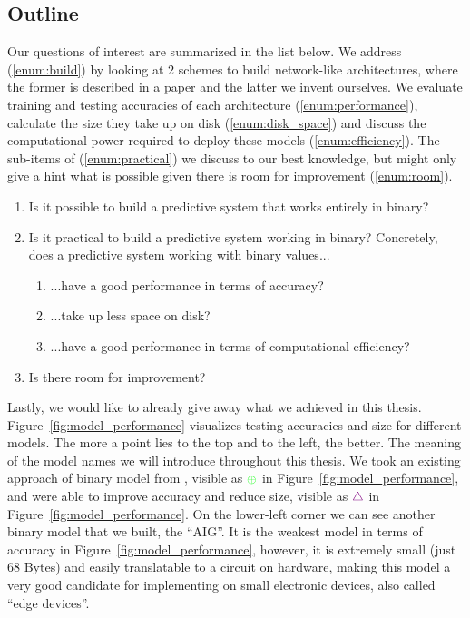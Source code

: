 \subsection{Outline}
Our questions of interest are summarized in the list below. We address (\ref{enum:build}) by looking at 2 schemes to build network-like architectures, where the former is described in a paper \cite{bib:chatterjee2018learning} and the latter we invent ourselves. We evaluate training and testing accuracies of each architecture (\ref{enum:performance}), calculate the size they take up on disk (\ref{enum:disk_space}) and discuss the computational power required to deploy these models (\ref{enum:efficiency}). The sub-items of (\ref{enum:practical}) we discuss to our best knowledge, but might only give a hint what is possible given there is room for improvement (\ref{enum:room}).

\begin{enumerate}
  \item \label{enum:build} Is it possible to build a predictive system that works entirely in binary?
  \item \label{enum:practical} Is it practical to build a predictive system working in binary? Concretely, does a predictive system working with binary values...
    \begin{enumerate}
      \item \label{enum:performance} ...have a good performance in terms of accuracy?
      \item \label{enum:disk_space} ...take up less space on disk?
      \item \label{enum:efficiency} ...have a good performance in terms of computational efficiency?
    \end{enumerate}
  \item \label{enum:room} Is there room for improvement?
\end{enumerate}

\noindent Lastly, we would like to already give away what we achieved in this thesis. Figure~\ref{fig:model_performance} visualizes testing accuracies and size for different models. The more a point lies to the top and to the left, the better. The meaning of the model names we will introduce throughout this thesis. We took an existing approach of binary model from \cite{bib:chatterjee2018learning}, visible as $\color{green} \oplus$ in Figure~\ref{fig:model_performance}, and were able to improve accuracy and reduce size, visible as $\color{violet} \bigtriangleup$ in Figure~\ref{fig:model_performance}. On the lower-left corner we can see another binary model that we built, the \enquote{AIG}. It is the weakest model in terms of accuracy in Figure~\ref{fig:model_performance}, however, it is extremely small (just 68 Bytes) and easily translatable to a circuit on hardware, making this model a very good candidate for implementing on small electronic devices, also called \enquote{edge devices}.

